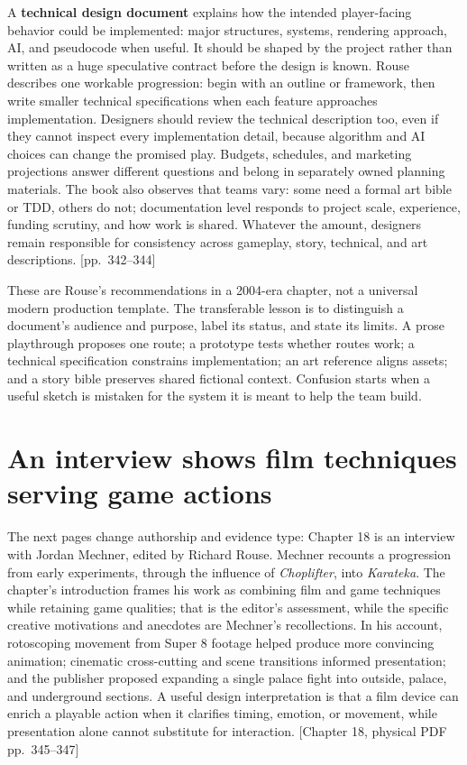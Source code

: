 A \textbf{technical design document} explains how the intended player-facing behavior could be implemented: major structures, systems, rendering approach, AI, and pseudocode when useful. It should be shaped by the project rather than written as a huge speculative contract before the design is known. Rouse describes one workable progression: begin with an outline or framework, then write smaller technical specifications when each feature approaches implementation. Designers should review the technical description too, even if they cannot inspect every implementation detail, because algorithm and AI choices can change the promised play. Budgets, schedules, and marketing projections answer different questions and belong in separately owned planning materials. The book also observes that teams vary: some need a formal art bible or TDD, others do not; documentation level responds to project scale, experience, funding scrutiny, and how work is shared. Whatever the amount, designers remain responsible for consistency across gameplay, story, technical, and art descriptions. {[}pp.~342--344{]}

These are Rouse's recommendations in a 2004-era chapter, not a universal modern production template. The transferable lesson is to distinguish a document's audience and purpose, label its status, and state its limits. A prose playthrough proposes one route; a prototype tests whether routes work; a technical specification constrains implementation; an art reference aligns assets; and a story bible preserves shared fictional context. Confusion starts when a useful sketch is mistaken for the system it is meant to help the team build.

\section{An interview shows film techniques serving game actions}\label{06-engine-ii-ch046-an-interview-shows-film-techniques-serving-game-actions}

The next pages change authorship and evidence type: Chapter 18 is an interview with Jordan Mechner, edited by Richard Rouse. Mechner recounts a progression from early experiments, through the influence of \emph{Choplifter}, into \emph{Karateka}. The chapter's introduction frames his work as combining film and game techniques while retaining game qualities; that is the editor's assessment, while the specific creative motivations and anecdotes are Mechner's recollections. In his account, rotoscoping movement from Super 8 footage helped produce more convincing animation; cinematic cross-cutting and scene transitions informed presentation; and the publisher proposed expanding a single palace fight into outside, palace, and underground sections. A useful design interpretation is that a film device can enrich a playable action when it clarifies timing, emotion, or movement, while presentation alone cannot substitute for interaction. {[}Chapter 18, physical PDF pp.~345--347{]}

